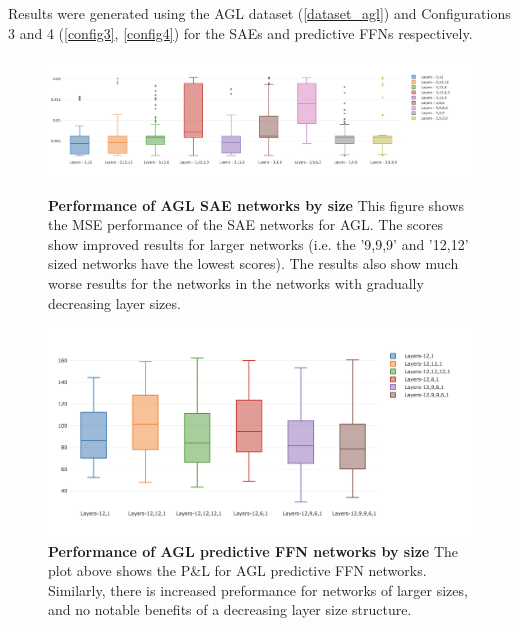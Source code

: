 \documentclass[a4paper,11pt,oneside]{article}
\theoremstyle{plain}
\theoremstyle{definition}
\begin{document}
Results were generated using the AGL dataset (\ref{dataset_agl}) and Configurations 3 and 4 (\ref{config3}, \ref{config4}) for the SAEs and predictive FFNs respectively.

\begin{figure}[H]
	\centering
	\begin{minipage}{0.45\textwidth}
		\centering 
		\includegraphics[scale=0.2]{images/iteration_five/it5_sae_size.png}
		\caption{\textbf{Performance of AGL SAE networks by size} \newline 
			This figure shows the MSE performance of the SAE networks for AGL. The scores show improved results for larger networks (i.e. the '9,9,9' and '12,12' sized networks have the lowest scores). The results also show much worse results for the networks in the networks with gradually decreasing layer sizes.}
		\label{figure-results_sae_size_agl}
	\end{minipage}\hfill
	\begin{minipage}{0.45\textwidth}
		\centering 
		\includegraphics[scale=0.2]{images/iteration_five/it_5_ffn_size.png}
		\caption{\textbf{Performance of AGL predictive FFN networks by size} \newline
			 The plot above shows the P\&L for AGL predictive FFN networks. Similarly, there is increased preformance for networks of larger sizes, and no notable benefits of a decreasing layer size structure.}
		\label{figure-results_ffn_size_agl}
	\end{minipage}
\end{figure}
\end{document}
